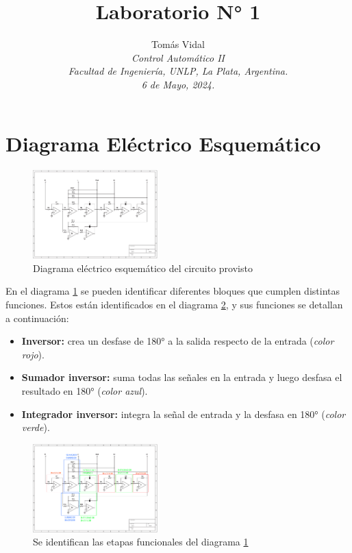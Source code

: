 \documentclass[letterpaper, 10 pt, conference]{ieeeconf}  %
\title{\LARGE \bf Laboratorio N° 1}
\author{
  Tom\'as Vidal\\
  {\it Control Automático II}\\
  {\it Facultad de Ingenier\'ia, UNLP, La Plata, Argentina.}\\
  {\it 6 de Mayo, 2024.}
}                                            %
\begin{document}
\maketitle
\thispagestyle{empty}
\pagestyle{empty}

\section{Diagrama Eléctrico Esquemático}
\begin{figure}[H]
  \centering
  \includegraphics[width=0.43\textwidth]{./Imagenes/DiagElecEsquematico.png}
  \caption{Diagrama eléctrico esquemático del circuito provisto}
  \label{fig:diag_elect_esq}
\end{figure}

En el diagrama \ref{fig:diag_elect_esq} se pueden identificar diferentes bloques que cumplen distintas funciones. Estos están identificados en el diagrama \ref{fig:diag_elec_esq_etapas}, y sus funciones se detallan a continuación:
\begin{itemize}
  \item \textbf{Inversor:} crea un desfase de \ang{180} a la salida respecto de la entrada (\textit{color rojo}).
  \item \textbf{Sumador inversor:} suma todas las señales en la entrada y luego desfasa el resultado en \ang{180} (\textit{color azul}).
  \item \textbf{Integrador inversor:} integra la señal de entrada y la desfasa en \ang{180}  (\textit{color verde}).
\end{itemize}
\begin{figure}[H]
  \centering
  \includegraphics[width=0.43\textwidth]{./Imagenes/DiagElecEsqEtapasIdent.png}
  \caption{Se identifican las etapas funcionales del diagrama \ref{fig:diag_elect_esq}}
  \label{fig:diag_elec_esq_etapas}
\end{figure}
\end{document}
